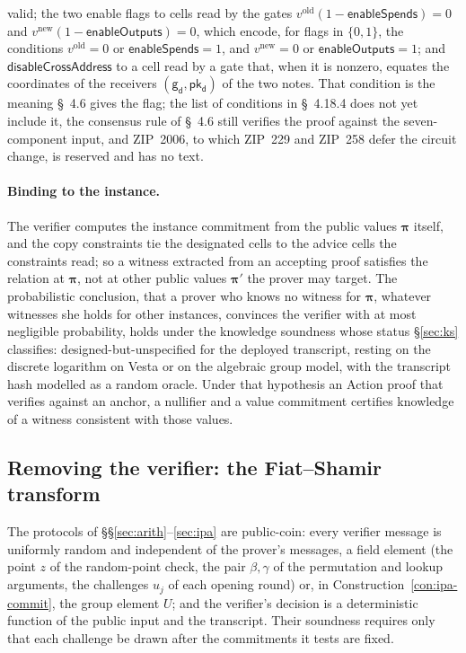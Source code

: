 \documentclass[11pt,a4paper]{article}
\theoremstyle{definition}
\newcommand{\pkd}{\ensuremath{\mathsf{pk_d}}}
\newcommand{\gd}{\ensuremath{\mathsf{g_d}}}
\begin{document}
valid; the two enable flags to cells read by the gates
$v^{\mathrm{old}}(1 - \mathsf{enableSpends}) = 0$ and
$v^{\mathrm{new}}(1 - \mathsf{enableOutputs}) = 0$, which encode, for
flags in $\{0, 1\}$, the conditions $v^{\mathrm{old}} = 0$ or
$\mathsf{enableSpends} = 1$, and $v^{\mathrm{new}} = 0$ or
$\mathsf{enableOutputs} = 1$; and $\mathsf{disableCrossAddress}$ to a cell
read by a gate that, when it is nonzero, equates the coordinates of the
receivers $(\gd, \pkd)$ of the two notes. That condition is the meaning
\S~4.6 gives the flag; the list of conditions in \S~4.18.4 does not yet
include it, the consensus rule of \S~4.6 still verifies the proof against
the seven-component input, and ZIP~2006, to which ZIP~229 and ZIP~258 defer
the circuit change, is reserved and has no text.

\paragraph{Binding to the instance.}
The verifier computes the instance commitment from the public values
$\boldsymbol\pi$ itself, and the copy constraints tie the designated
cells to the advice cells the constraints read; so a witness extracted
from an accepting proof satisfies the relation at $\boldsymbol\pi$, not at
other public values $\boldsymbol\pi'$ the prover may target. The
probabilistic conclusion, that a prover who knows no witness for
$\boldsymbol\pi$, whatever witnesses she holds for other instances,
convinces the verifier with at most negligible probability, holds under
the knowledge soundness whose status \S\ref{sec:ks} classifies:
designed-but-unspecified for the deployed transcript, resting on the
discrete logarithm on Vesta or on the algebraic group model, with the
transcript hash modelled as a random oracle. Under that hypothesis an
Action proof that verifies against an anchor, a nullifier and a value
commitment certifies knowledge of a witness consistent with those
values.

\subsection{Removing the verifier: the Fiat--Shamir transform}
\label{sec:halo2-fs}

The protocols of \S\S\ref{sec:arith}--\ref{sec:ipa} are public-coin:
every verifier message is uniformly random and independent of the
prover's messages, a field element (the point $z$ of the random-point
check, the pair $\beta, \gamma$ of the permutation and lookup arguments,
the challenges $u_j$ of each opening round) or, in
Construction~\ref{con:ipa-commit}, the group element $U$; and the
verifier's decision is a deterministic function of the
public input and the transcript. Their soundness requires only that each
challenge be drawn after the commitments it tests are fixed.
\end{document}
